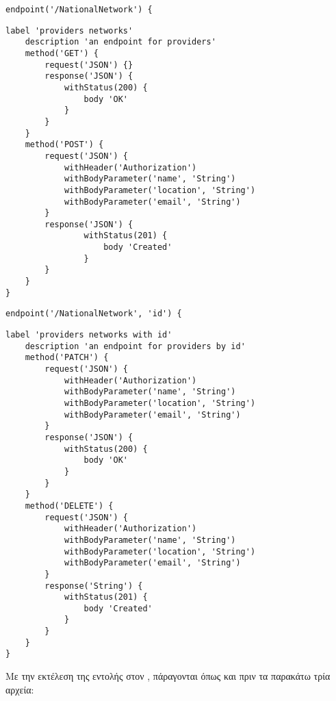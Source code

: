 \begin{lstlisting}
endpoint('/NationalNetwork') {
\end{lstlisting}
\begin{lstlisting}[deletekeywords={endpoint}]
    label 'providers networks'
    description 'an endpoint for providers'
    method('GET') {
        request('JSON') {}
        response('JSON') {
            withStatus(200) {
                body 'OK'
            }
        }
    }
    method('POST') {
        request('JSON') {
            withHeader('Authorization')
            withBodyParameter('name', 'String')
            withBodyParameter('location', 'String')
            withBodyParameter('email', 'String')
        }
        response('JSON') {
                withStatus(201) {
                    body 'Created'
                }
        }
    }
}
\end{lstlisting}
\begin{lstlisting}
endpoint('/NationalNetwork', 'id') {
\end{lstlisting}
\begin{lstlisting}[deletekeywords={endpoint}]
    label 'providers networks with id'
    description 'an endpoint for providers by id'
    method('PATCH') {
        request('JSON') {
            withHeader('Authorization')
            withBodyParameter('name', 'String')
            withBodyParameter('location', 'String')
            withBodyParameter('email', 'String')
        }
        response('JSON') {
            withStatus(200) {
                body 'OK'
            }
        }
    }
    method('DELETE') {
        request('JSON') {
            withHeader('Authorization')
            withBodyParameter('name', 'String')
            withBodyParameter('location', 'String')
            withBodyParameter('email', 'String')
        }
        response('String') {
            withStatus(201) {
                body 'Created'
            }
        }
    }
}
\end{lstlisting}

Με την εκτέλεση της εντολής \emph{} στον ,
πάραγονται όπως και πριν τα παρακάτω τρία αρχεία:

